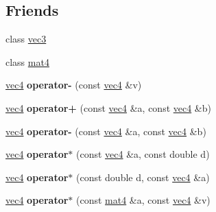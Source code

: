 \subsection*{Friends}
\begin{DoxyCompactItemize}
\item 
\hypertarget{classvec4_aa849243c6cd858bbcd88237a8ad16cad}{
class \hyperlink{classvec4_aa849243c6cd858bbcd88237a8ad16cad}{vec3}}
\label{classvec4_aa849243c6cd858bbcd88237a8ad16cad}

\item 
\hypertarget{classvec4_a97061e9e921b7126184d68807056591e}{
class \hyperlink{classvec4_a97061e9e921b7126184d68807056591e}{mat4}}
\label{classvec4_a97061e9e921b7126184d68807056591e}

\item 
\hypertarget{classvec4_ad251adce26c15c60b47175794dcee239}{
\hyperlink{classvec4}{vec4} {\bfseries operator-\/} (const \hyperlink{classvec4}{vec4} \&v)}
\label{classvec4_ad251adce26c15c60b47175794dcee239}

\item 
\hypertarget{classvec4_abbfa144d13bf5c0d487dd48b6ef95b68}{
\hyperlink{classvec4}{vec4} {\bfseries operator+} (const \hyperlink{classvec4}{vec4} \&a, const \hyperlink{classvec4}{vec4} \&b)}
\label{classvec4_abbfa144d13bf5c0d487dd48b6ef95b68}

\item 
\hypertarget{classvec4_a4e0631feb67b2a813523880ffa031c89}{
\hyperlink{classvec4}{vec4} {\bfseries operator-\/} (const \hyperlink{classvec4}{vec4} \&a, const \hyperlink{classvec4}{vec4} \&b)}
\label{classvec4_a4e0631feb67b2a813523880ffa031c89}

\item 
\hypertarget{classvec4_ac40d65df68e1401e80087d859c8f63b0}{
\hyperlink{classvec4}{vec4} {\bfseries operator$\ast$} (const \hyperlink{classvec4}{vec4} \&a, const double d)}
\label{classvec4_ac40d65df68e1401e80087d859c8f63b0}

\item 
\hypertarget{classvec4_a02752b4a8354413b9ebf08ceb4158286}{
\hyperlink{classvec4}{vec4} {\bfseries operator$\ast$} (const double d, const \hyperlink{classvec4}{vec4} \&a)}
\label{classvec4_a02752b4a8354413b9ebf08ceb4158286}

\item 
\hypertarget{classvec4_a0252c203e5a77099da7fd04c576ed437}{
\hyperlink{classvec4}{vec4} {\bfseries operator$\ast$} (const \hyperlink{classmat4}{mat4} \&a, const \hyperlink{classvec4}{vec4} \&v)}
\label{classvec4_a0252c203e5a77099da7fd04c576ed437}


\end{DoxyCompactItemize}
